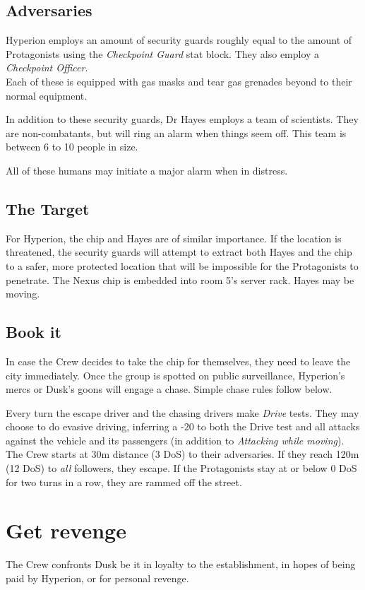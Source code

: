 \subsection*{Adversaries}
Hyperion employs an amount of security guards
	roughly equal to the amount of Protagonists
	using the \emph{Checkpoint Guard} stat block.
They also employ a \emph{Checkpoint Officer}.
\\%
Each of these is equipped with
gas masks and tear gas grenades
beyond to their normal equipment.
\par%
In addition to these security guards,
	Dr Hayes employs a team of scientists.
They are non-combatants,
	but will ring an alarm
	when things seem off.
This team is between 6 to 10 people in size.
\par%
All of these humans may initiate a major alarm
	when in distress.
\subsection*{The Target}
For Hyperion, the chip and Hayes are of similar importance.
If the location is threatened,
	the security guards will attempt to extract
	both Hayes and the chip
	to a safer, more protected location that will be impossible for the Protagonists to penetrate.
The Nexus chip is embedded into room 5's server rack.
Hayes may be moving.

\subsection{Book it}
\label{sec:flee}
In case the Crew decides to take the chip for themselves,
	they need to leave the city immediately.
Once the group is spotted on public surveillance,
	Hyperion's mercs or Dusk's goons
	will engage a chase.
Simple chase rules follow below.
\par
Every turn
	the escape driver and the chasing drivers
	make \emph{Drive} tests.
They may choose to do evasive driving,
	inferring a -20 to both the Drive test
	and all attacks against the vehicle and its passengers
	(in addition to \emph{Attacking while moving}).
\\%
The Crew starts at 30m distance (3 DoS) to their adversaries.
If they reach 120m (12 DoS) to \emph{all} followers,
	they escape.
If the Protagonists stay at or below 0 DoS for two turns in a row,
	they are rammed off the street.

\section{Get revenge}
\label{sec:revenge}
The Crew confronts Dusk
	be it
	in loyalty to the establishment,
	in hopes of being paid by Hyperion,
	or for personal revenge.
